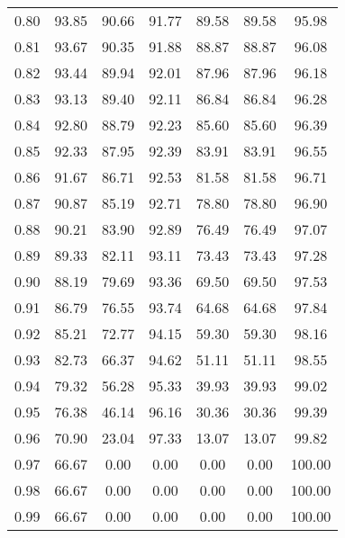 \begin{tabular}{|c|c|c|c|c|c|c|}
      0.80 &     93.85 &     90.66 &      91.77 &   89.58 &      89.58 &         95.98 \\
      0.81 &     93.67 &     90.35 &      91.88 &   88.87 &      88.87 &         96.08 \\
      0.82 &     93.44 &     89.94 &      92.01 &   87.96 &      87.96 &         96.18 \\
      0.83 &     93.13 &     89.40 &      92.11 &   86.84 &      86.84 &         96.28 \\
      0.84 &     92.80 &     88.79 &      92.23 &   85.60 &      85.60 &         96.39 \\
      0.85 &     92.33 &     87.95 &      92.39 &   83.91 &      83.91 &         96.55 \\
      0.86 &     91.67 &     86.71 &      92.53 &   81.58 &      81.58 &         96.71 \\
      0.87 &     90.87 &     85.19 &      92.71 &   78.80 &      78.80 &         96.90 \\
      0.88 &     90.21 &     83.90 &      92.89 &   76.49 &      76.49 &         97.07 \\
      0.89 &     89.33 &     82.11 &      93.11 &   73.43 &      73.43 &         97.28 \\
      0.90 &     88.19 &     79.69 &      93.36 &   69.50 &      69.50 &         97.53 \\
      0.91 &     86.79 &     76.55 &      93.74 &   64.68 &      64.68 &         97.84 \\
      0.92 &     85.21 &     72.77 &      94.15 &   59.30 &      59.30 &         98.16 \\
      0.93 &     82.73 &     66.37 &      94.62 &   51.11 &      51.11 &         98.55 \\
      0.94 &     79.32 &     56.28 &      95.33 &   39.93 &      39.93 &         99.02 \\
      0.95 &     76.38 &     46.14 &      96.16 &   30.36 &      30.36 &         99.39 \\
      0.96 &     70.90 &     23.04 &      97.33 &   13.07 &      13.07 &         99.82 \\
      0.97 &     66.67 &      0.00 &       0.00 &    0.00 &       0.00 &        100.00 \\
      0.98 &     66.67 &      0.00 &       0.00 &    0.00 &       0.00 &        100.00 \\
      0.99 &     66.67 &      0.00 &       0.00 &    0.00 &       0.00 &        100.00 \\
\bottomrule
\end{tabular}

